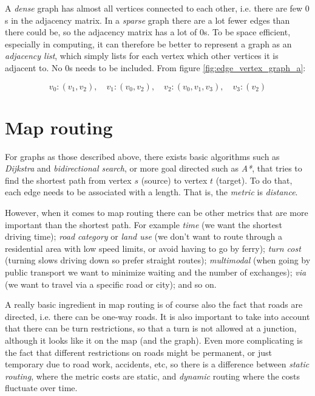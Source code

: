 \documentclass[../main.tex]{subfiles}
\begin{document}
\vspace{1em}
\noindent
A \emph{dense} graph has almost all vertices connected to each other, i.e. there are few $0$s in the adjacency matrix. In a \emph{sparse} graph there are a lot fewer edges than there could be, so the adjacency matrix has a lot of $0$s. To be space efficient, especially in computing, it can therefore be better to represent a graph as an \emph{adjacency list}, which simply lists for each vertex which other vertices it is adjacent to. No $0$s needs to be included. From figure \ref{fig:edge_vertex_graph_a}:

\begin{equation}
v_0: (v_1, v_2), \quad
v_1: (v_0, v_2), \quad
v_2: (v_0, v_1, v_3), \quad
v_3: (v_2)
\end{equation}


\section{Map routing}
For graphs as those described above, there exists basic algorithms such as \emph{Dijkstra} and \emph{bidirectional search}, or more goal directed such as \emph{A*}, that tries to find the shortest path from vertex $s$ (source) to vertex $t$ (target). To do that, each edge needs to be associated with a length. That is, the \emph{metric} is \emph{distance}.

However, when it comes to map routing there can be other metrics that are more important than the shortest path. For example \emph{time} (we want the shortest driving time); \emph{road category} or \emph{land use} (we don't want to route through a residential area with low speed limits, or avoid having to go by ferry); \emph{turn cost} (turning slows driving down so prefer straight routes); \emph{multimodal} (when going by public transport we want to minimize waiting and the number of exchanges); \emph{via} (we want to travel via a specific road or city); and so on.

A really basic ingredient in map routing is of course also the fact that roads are directed, i.e. there can be one-way roads. It is also important to take into account that there can be turn restrictions, so that a turn is not allowed at a junction, although it looks like it on the map (and the graph). Even more complicating is the fact that different restrictions on roads might be permanent, or just temporary due to road work, accidents, etc, so there is a difference between \emph{static routing}, where the metric costs are static, and \emph{dynamic} routing where the costs fluctuate over time.
\end{document}

